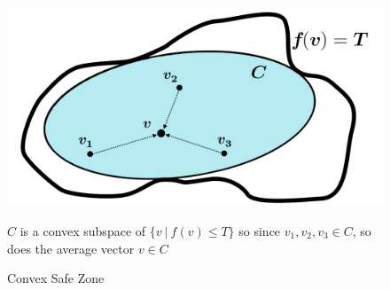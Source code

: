 \documentclass[10pt, conference]{IEEEtran}
\begin{document}
\begin{figure}[h]
\begin{center}
\includegraphics[width=0.85\linewidth]{Pics/PNGs/ConvexSafeZone.png}
\end{center}
\caption{Convex Safe Zone}
\label{fig:ConvexSafeZoneSketch}
\medskip
\small
$C$ is a convex subspace of ${\{v \ | \ f(v) \leq T\}}$ so since ${v_1,v_2,v_3 \in C}$, so does the average vector $v \in C$
\end{figure}
\end{document}
